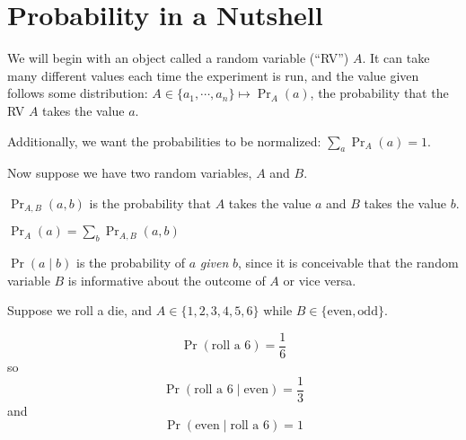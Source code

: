\documentclass[a4paper,twoside,master.tex]{subfiles}
\begin{document}

\section{Probability in a Nutshell}
\label{sec:probability_in_a_nutshell}

We will begin with an object called a random variable (``RV'') $ A $. It can take many different values each time the experiment is run, and the value given follows some distribution: $ A \in \{a_1, \cdots, a_n\} \mapsto \Pr_A(a) $, the probability that the RV $ A $ takes the value $ a $.

Additionally, we want the probabilities to be normalized: $ \sum_a \Pr_A(a) = 1 $.

Now suppose we have two random variables, $ A $ and $ B $.

\begin{definition}
    $ \Pr_{A,B}(a,b) $ is the probability that $ A $ takes the value $ a $ and $ B $ takes the value $ b $.
\end{definition}

\begin{definition}
    $ \Pr_A(a) = \sum_b \Pr_{A,B}(a,b) $
\end{definition}

\begin{definition}
    $ \Pr(a\mid b) $ is the probability of $ a $ \textit{given} $ b $, since it is conceivable that the random variable $ B $ is informative about the outcome of $ A $ or vice versa.
\end{definition}

\begin{ex}
    Suppose we roll a die, and $ A \in \{1,2,3,4,5,6\} $ while $ B \in \{\text{even}, \text{odd}\} $.

    \begin{equation}
        \Pr(\text{roll a } 6) = \frac{1}{6}
    \end{equation}
    so
    \begin{equation}
        \Pr(\text{roll a } 6 \mid \text{even}) = \frac{1}{3} 
    \end{equation}
    and
    \begin{equation}
        \Pr(\text{even}\mid \text{roll a } 6) = 1
    \end{equation}
\end{ex}
\end{document}
